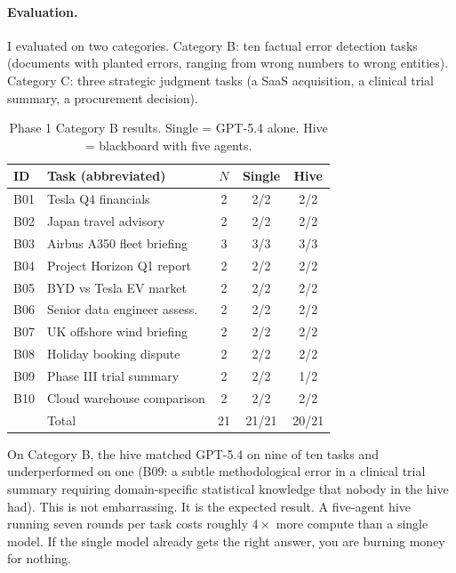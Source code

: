 \documentclass[10pt,twocolumn]{article}
\begin{document}
\paragraph{Evaluation.}
I evaluated on two categories. Category B: ten factual error detection tasks (documents with planted errors, ranging from wrong numbers to wrong entities). Category C: three strategic judgment tasks (a SaaS acquisition, a clinical trial summary, a procurement decision).

\begin{table}[h]
\centering
\caption{Phase 1 Category B results. Single = GPT-5.4 alone. Hive = blackboard with five agents.}
\label{tab:catb}
\small
\setlength{\tabcolsep}{3pt}
\begin{tabular}{llccc}
\toprule
ID & Task (abbreviated) & $N$ & Single & Hive \\
\midrule
B01 & Tesla Q4 financials         & 2 & 2/2 & 2/2 \\
B02 & Japan travel advisory        & 2 & 2/2 & 2/2 \\
B03 & Airbus A350 fleet briefing   & 3 & 3/3 & 3/3 \\
B04 & Project Horizon Q1 report    & 2 & 2/2 & 2/2 \\
B05 & BYD vs Tesla EV market       & 2 & 2/2 & 2/2 \\
B06 & Senior data engineer assess. & 2 & 2/2 & 2/2 \\
B07 & UK offshore wind briefing    & 2 & 2/2 & 2/2 \\
B08 & Holiday booking dispute      & 2 & 2/2 & 2/2 \\
B09 & Phase III trial summary      & 2 & 2/2 & 1/2 \\
B10 & Cloud warehouse comparison   & 2 & 2/2 & 2/2 \\
\midrule
    & Total                        & 21 & 21/21 & 20/21 \\
\bottomrule
\end{tabular}
\end{table}

On Category B, the hive matched GPT-5.4 on nine of ten tasks and underperformed on one (B09: a subtle methodological error in a clinical trial summary requiring domain-specific statistical knowledge that nobody in the hive had). This is not embarrassing. It is the expected result. A five-agent hive running seven rounds per task costs roughly $4\times$ more compute than a single model. If the single model already gets the right answer, you are burning money for nothing.
\end{document}
